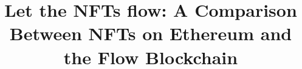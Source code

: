 \documentclass[conference]{IEEEtran}
\begin{document}

\title{Let the NFTs flow: A Comparison Between NFTs on Ethereum and the Flow Blockchain}


\maketitle
\end{document}
